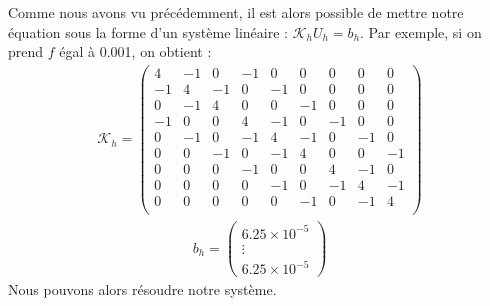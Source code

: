 Comme nous avons vu précédemment, il est alors possible de mettre notre équation sous la forme d'un système linéaire : $\mathcal{K}_{h}U_{h}=b_{h}$. Par exemple, si on prend $f$ égal à 0.001, on obtient :
\begin{align*}
\mathcal{K}_{h}=\left(
\begin{matrix}
4  &    -1    &  0   &   -1    &  0  &    0   &   0  &    0  &    0\\
-1   &   4  &    -1  &    0     & -1  &    0  &    0  &    0  &    0\\
0    &  -1    &  4   &   0    &  0   &   -1 &     0   &   0 &     0\\
-1  &    0   &   0    &  4   &   -1 &     0   &   -1  &    0  &    0\\
0  &    -1   &   0   &   -1  &    4    &  -1  &    0   &   -1  &    0\\
0   &   0  &    -1   &   0   &   -1  &    4   &   0  &    0  &    -1\\
0   &   0   &   0   &   -1    &  0    &  0  &    4   &   -1   &   0\\
0    &  0    &  0   &   0    &  -1    &  0   &   -1  &    4    &  -1\\
0    &  0  &    0   &   0    &  0   &   -1   &   0    &  -1   &   4\\
\end{matrix}\right)
\end{align*}
\begin{align*}
b_h =\left(
\begin{matrix}
6.25\times 10^{-5}\\
\vdots\\
6.25\times 10^{-5}
\end{matrix}\right)
\end{align*}
Nous pouvons alors résoudre notre système.
